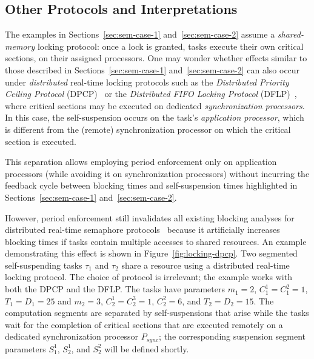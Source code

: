 \subsection{Other Protocols and Interpretations}

The examples in Sections~\ref{sec:sem-case-1} and~\ref{sec:sem-case-2} assume a \emph{shared-memory} locking protocol: once a lock is granted, tasks execute their own critical sections, on their assigned processors. One may wonder whether  effects similar to those described in Sections~\ref{sec:sem-case-1} and~\ref{sec:sem-case-2} can also occur under \emph{distributed} real-time locking protocols such as the \emph{Distributed Priority Ceiling Protocol} (DPCP)~\cite{RSL:88,Raj:91} or the \emph{Distributed FIFO Locking Protocol} (DFLP)~\cite{Br:13,Br:14}, where critical sections may be executed on dedicated \emph{synchronization processors}. In this case, the self-suspension occurs on the task's \emph{application processor}, which is different from the (remote) synchronization processor on which the critical section is executed.

This separation allows employing period enforcement  only on application processors (while avoiding it on synchronization processors) without incurring the feedback cycle between blocking times and self-suspension times highlighted in Sections~\ref{sec:sem-case-1} and~\ref{sec:sem-case-2}.

However, period enforcement still invalidates all existing blocking analyses for distributed real-time semaphore protocols~\cite{RSL:88,Raj:91,Br:13} because it artificially increases blocking times if tasks contain multiple accesses to shared resources. An example demonstrating this effect is shown in Figure~\ref{fig:locking-dpcp}. Two segmented self-suspending tasks $\tau_1$ and $\tau_2$ share a resource using a distributed real-time locking protocol. The choice of protocol is irrelevant; the example works with both the DPCP and the DFLP. The tasks have parameters $m_1 = 2$, $C_1^1 = C_1^2 = 1$, $T_1 = D_1 = 25$ and $m_2 = 3$, $C_2^1 = C_2^3 = 1$, $C^2_2 = 6$, and $T_2 = D_2 = 15$. The computation segments are separated by self-suspensions that arise while the tasks wait for the completion of critical sections that are executed remotely on a dedicated synchronization processor $P_{sync}$; the corresponding suspension segment parameters $S_1^1$, $S_2^1$, and $S_2^2$ will be defined shortly.

